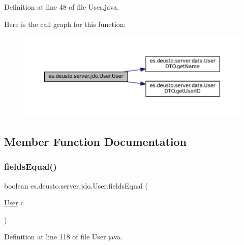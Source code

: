 Definition at line 48 of file User.\+java.

Here is the call graph for this function\+:
\nopagebreak
\begin{figure}[H]
\begin{center}
\leavevmode
\includegraphics[width=350pt]{classes_1_1deusto_1_1server_1_1jdo_1_1_user_aba393844e4f390b5756de0058777f9a5_cgraph}
\end{center}
\end{figure}


\subsection{Member Function Documentation}
\mbox{\label{classes_1_1deusto_1_1server_1_1jdo_1_1_user_a52fa0dedc394edca2c1d089ec632996b}} 
\subsubsection{\texorpdfstring{fieldsEqual()}{fieldsEqual()}}
{\footnotesize\ttfamily boolean es.\+deusto.\+server.\+jdo.\+User.\+fields\+Equal (\begin{DoxyParamCaption}\item[{\mbox{\hyperlink{classes_1_1deusto_1_1server_1_1jdo_1_1_user}{User}}}]{c }\end{DoxyParamCaption})}



Definition at line 118 of file User.\+java.

\mbox{\label{classes_1_1deusto_1_1server_1_1jdo_1_1_user_aa1ba6d9e3d0572b90dac6ff627ee3f95}} 
